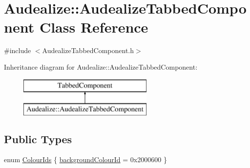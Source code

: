 \hypertarget{class_audealize_1_1_audealize_tabbed_component}{}\section{Audealize\+:\+:Audealize\+Tabbed\+Component Class Reference}
\label{class_audealize_1_1_audealize_tabbed_component}


{\ttfamily \#include $<$Audealize\+Tabbed\+Component.\+h$>$}

Inheritance diagram for Audealize\+:\+:Audealize\+Tabbed\+Component\+:\begin{figure}[H]
\begin{center}
\leavevmode
\includegraphics[height=2.000000cm]{class_audealize_1_1_audealize_tabbed_component}
\end{center}
\end{figure}
\subsection*{Public Types}
\begin{DoxyCompactItemize}
\item 
enum \hyperlink{class_audealize_1_1_audealize_tabbed_component_aa816a099502c5633df0e477993dd1f2d}{Colour\+Ids} \{ \hyperlink{class_audealize_1_1_audealize_tabbed_component_aa816a099502c5633df0e477993dd1f2da6f6ddd411d9553470397a3f46ee5a8b5}{background\+Colour\+Id} = 0x2000600
 \}
\end{DoxyCompactItemize}
